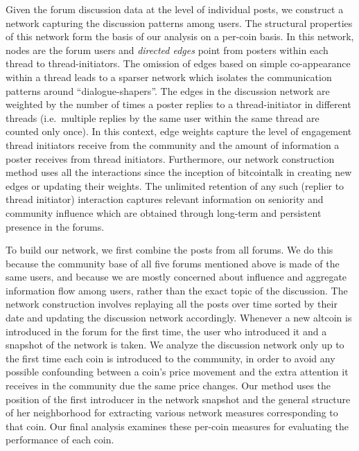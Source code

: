 
Given the forum discussion data at the level of individual posts, we  construct a network capturing the discussion patterns among users. The structural properties of this network form the basis of our analysis on a per-coin basis. In this network, nodes are the forum users and \textit{directed edges} point from posters within each thread to thread-initiators. The omission of edges based on simple co-appearance within a thread leads to a sparser network which isolates the communication patterns around ``dialogue-shapers''. The edges in the discussion network are weighted by the number of times a poster replies to a thread-initiator in different threads (i.e.~multiple replies by the same user within the same thread are counted only once).
In this context, edge weights capture the level of engagement thread initiators receive from the community and the amount of information a poster receives from thread initiators. Furthermore, our network construction method uses all the interactions since the inception of bitcointalk in creating new edges or updating their weights. The unlimited retention of any such (replier to thread initiator) interaction captures relevant information on seniority and community influence which are obtained through long-term and persistent presence in the forums. 

To build our network, we first combine the posts from all forums. We do this because the community base of all five forums mentioned above is made of the same users, and because we are mostly concerned about influence and aggregate information flow among users, rather than the exact topic of the discussion.
The network construction involves replaying all the posts over time sorted by their date and updating the
discussion network accordingly. Whenever a new altcoin is introduced
in the forum for the first time, the user who introduced it and a snapshot of the network is taken. 
We analyze the discussion network only up to the first time each coin is introduced to the community, in order to avoid any possible confounding between a coin's price movement and the extra attention it receives in the community due the same price changes. Our method uses the position of the first introducer in the network snapshot and the general structure of her neighborhood for extracting various network measures corresponding to that coin. Our final analysis examines these per-coin measures for evaluating the performance of each coin.



